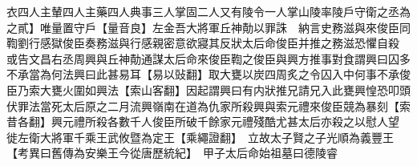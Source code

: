 衣四人主輦四人主藥四人典事三人掌固二人又有陵令一人掌山陵率陵戶守衛之丞為之貳】唯量置守戶【量音良】左金吾大將軍丘神勣以罪誅　納言史務滋與來俊臣同鞫劉行感獄俊臣奏務滋與行感親密意欲寢其反狀太后命俊臣并推之務滋恐懼自殺　或告文昌右丞周興與丘神勣通謀太后命來俊臣鞫之俊臣與興方推事對食謂興曰囚多不承當為何法興曰此甚易耳【易以䜴翻】取大甕以炭四周炙之令囚入中何事不承俊臣乃索大甕火圍如興法【索山客翻】因起謂興曰有内狀推兄請兄入此甕興惶恐叩頭伏罪法當死太后原之二月流興嶺南在道為仇家所殺興與索元禮來俊臣競為暴刻【索昔各翻】興元禮所殺各數千人俊臣所破千餘家元禮殘酷尤甚太后亦殺之以慰人望　徙左衛大將軍千乘王武攸暨為定王【乘繩證翻】　立故太子賢之子光順為義豐王　【考異曰舊傳為安樂王今從唐歷統紀】　甲子太后命始祖墓曰德陵睿